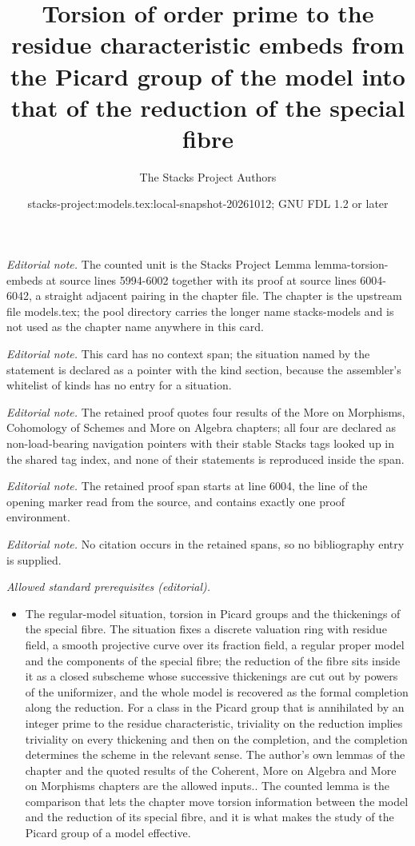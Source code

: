 \documentclass[10pt,a4paper]{amsart}
\title{Torsion of order prime to the residue characteristic embeds from the Picard group of the model into that of the reduction of the special fibre}
\author{The Stacks Project Authors}
\date{stacks-project:models.tex:local-snapshot-20261012; GNU FDL 1.2 or later}
\theoremstyle{plain}
\theoremstyle{definition}
\theoremstyle{remark}
\numberwithin{equation}{subsection}
\begin{document}
\maketitle
\noindent\textit{Editorial note.} The counted unit is the Stacks Project Lemma lemma-torsion-embeds at source lines 5994-6002 together with its proof at source lines 6004-6042, a straight adjacent pairing in the chapter file. The chapter is the upstream file models.tex; the pool directory carries the longer name stacks-models and is not used as the chapter name anywhere in this card.\par\medskip
\noindent\textit{Editorial note.} This card has no context span; the situation named by the statement is declared as a pointer with the kind section, because the assembler's whitelist of kinds has no entry for a situation.\par\medskip
\noindent\textit{Editorial note.} The retained proof quotes four results of the More on Morphisms, Cohomology of Schemes and More on Algebra chapters; all four are declared as non-load-bearing navigation pointers with their stable Stacks tags looked up in the shared tag index, and none of their statements is reproduced inside the span.\par\medskip
\noindent\textit{Editorial note.} The retained proof span starts at line 6004, the line of the opening marker read from the source, and contains exactly one proof environment.\par\medskip
\noindent\textit{Editorial note.} No citation occurs in the retained spans, so no bibliography entry is supplied.\par\medskip
\noindent\textit{Allowed standard prerequisites (editorial).}\begin{itemize}
\item The regular-model situation, torsion in Picard groups and the thickenings of the special fibre. The situation fixes a discrete valuation ring with residue field, a smooth projective curve over its fraction field, a regular proper model and the components of the special fibre; the reduction of the fibre sits inside it as a closed subscheme whose successive thickenings are cut out by powers of the uniformizer, and the whole model is recovered as the formal completion along the reduction. For a class in the Picard group that is annihilated by an integer prime to the residue characteristic, triviality on the reduction implies triviality on every thickening and then on the completion, and the completion determines the scheme in the relevant sense. The author's own lemmas of the chapter and the quoted results of the Coherent, More on Algebra and More on Morphisms chapters are the allowed inputs.. The counted lemma is the comparison that lets the chapter move torsion information between the model and the reduction of its special fibre, and it is what makes the study of the Picard group of a model effective.
\end{itemize}\medskip
\end{document}
